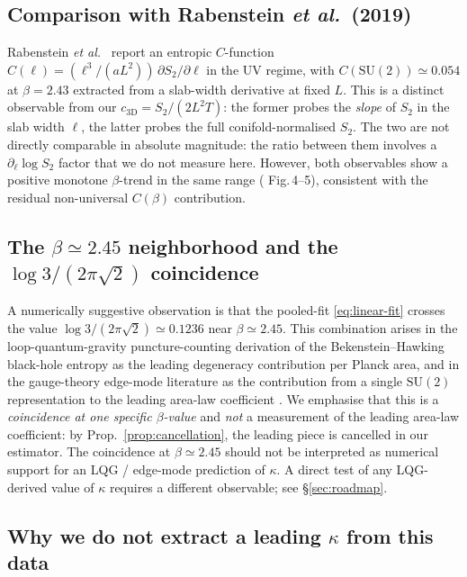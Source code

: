 \documentclass[11pt,a4paper]{article}
\theoremstyle{definition}
\newcommand{\SUtwo}{\mathrm{SU}(2)}
\newcommand{\threeD}{{3\text{D}}}
\begin{document}
\subsection{Comparison with Rabenstein \emph{et al.}\ (2019)}
\label{sec:rabenstein-compare}

Rabenstein \emph{et al.}\ \cite{Rabenstein2019} report an entropic
$C$-function $C(\ell) = (\ell^{3}/(aL^{2}))\,\partial S_{2}/\partial\ell$
in the UV regime, with $C(\SUtwo) \simeq 0.054$ at $\beta = 2.43$
extracted from a slab-width derivative at fixed $L$. This is a
distinct observable from our $c_{\threeD} = S_{2}/(2L^{2}T)$: the
former probes the \emph{slope} of $S_{2}$ in the slab width $\ell$,
the latter probes the full conifold-normalised $S_{2}$. The two are
not directly comparable in absolute magnitude: the ratio between them
involves a $\partial_{\ell}\log S_{2}$ factor that we do not measure
here. However, both observables show a positive monotone
$\beta$-trend in the same range (\cite{Rabenstein2019}
Fig.\,4--5), consistent with the residual non-universal
$C(\beta)$ contribution.

\subsection{The $\beta \simeq 2.45$ neighborhood and the
$\log 3/(2\pi\sqrt 2)$ coincidence}
\label{sec:logthree}

A numerically suggestive observation is that the pooled-fit
\eqref{eq:linear-fit} crosses the value
$\log 3/(2\pi\sqrt 2)\simeq 0.1236$ near $\beta\simeq 2.45$. This
combination arises in the loop-quantum-gravity puncture-counting
derivation of the Bekenstein--Hawking black-hole entropy
\cite{ABCK1998} as the leading degeneracy contribution per Planck
area, and in the gauge-theory edge-mode literature as the
contribution from a single $\SUtwo$ representation to the leading
area-law coefficient \cite{Donnelly2012,DonnellyWall2014}. We
emphasise that this is a \emph{coincidence at one specific
$\beta$-value} and \emph{not} a measurement of the leading area-law
coefficient: by Prop.~\ref{prop:cancellation}, the leading piece is
cancelled in our estimator. The coincidence at $\beta\simeq 2.45$
should not be interpreted as numerical support for an LQG / edge-mode
prediction of $\kappa$. A direct test of any LQG-derived value of
$\kappa$ requires a different observable; see
\S\ref{sec:roadmap}.

\subsection{Why we do not extract a leading $\kappa$ from this data}
\label{sec:why-no-kappa}
\end{document}
